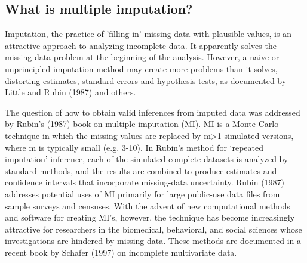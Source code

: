 \documentclass[12pt]{article}
\begin{document}
\subsection{What is multiple imputation?}

Imputation, the practice of 'filling in' missing data with plausible values, is an attractive approach to analyzing incomplete data. It apparently solves the missing-data problem at the beginning of the analysis. However, a naive or unprincipled imputation method may create more problems than it solves, distorting estimates, standard errors and hypothesis tests, as documented by Little and Rubin (1987) and others.

The question of how to obtain valid inferences from imputed data was addressed by Rubin's (1987) book on multiple imputation (MI). MI is a Monte Carlo technique in which the missing values are replaced by m>1 simulated versions, where m is typically small (e.g. 3-10). 
In Rubin's method for `repeated imputation' inference, each of the simulated complete datasets is analyzed by standard methods, and the results are combined to produce estimates and confidence intervals that incorporate missing-data uncertainty. Rubin (1987) addresses potential uses of MI primarily for large public-use data files from sample surveys and censuses. With the advent of new computational methods and software for creating MI's, however, the technique has become increasingly attractive for researchers in the biomedical, behavioral, and social sciences whose investigations are hindered by missing data. These methods are documented in a recent book by Schafer (1997) on incomplete multivariate data.
\end{document}
